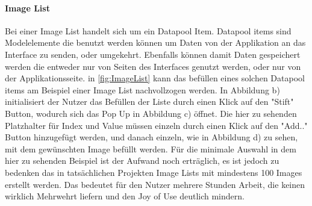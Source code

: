 \paragraph{Image List}
Bei einer Image List handelt sich um ein Datapool Item. 
Datapool items sind Modelelemente die benutzt werden können um Daten von der Applikation an das Interface zu senden, oder umgekehrt.
Ebenfalls können damit Daten gespeichert werden die entweder nur von Seiten des Interfaces genutzt werden, oder nur von der Applikationsseite.\cite{studio_guide}
in \cref{fig:ImageList} kann das befüllen eines solchen Datapool items am Beispiel einer Image List nachvollzogen werden.
In Abbildung b) initialisiert der Nutzer das Befüllen der Liste durch einen Klick auf den "Stift" Button, wodurch sich das Pop Up in Abbildung c) öffnet.
Die hier zu sehenden Platzhalter für Index und Value müssen einzeln durch einen Klick auf den "Add.." Button hinzugefügt werden, und danach einzeln, wie in Abbildung d) zu sehen, mit dem gewünschten Image befüllt werden.
Für die minimale Auswahl in dem hier zu sehenden Beispiel ist der Aufwand noch erträglich, es ist jedoch zu bedenken das in tatsächlichen Projekten Image Lists mit mindestens 100 Images erstellt werden.
Das bedeutet für den Nutzer mehrere Stunden Arbeit, die keinen wirklich Mehrwehrt liefern und den Joy of Use deutlich mindern.
